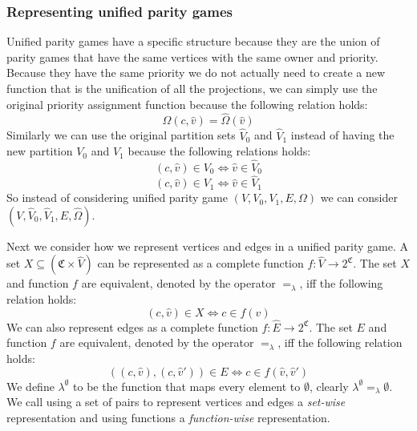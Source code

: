 \subsubsection{Representing unified parity games}
Unified parity games have a specific structure because they are the union of parity games that have the same vertices with the same owner and priority. Because they have the same priority we do not actually need to create a new function that is the unification of all the projections, we can simply use the original priority assignment function because the following relation holds:
\[ \Omega(c,\hat{v}) = \hat{\Omega}(\hat{v}) \]
Similarly we can use the original partition sets $\hat{V}_0$ and $\hat{V}_1$ instead of having the new partition $V_0$ and $V_1$ because the following relations holds:
\[ (c,\hat{v}) \in V_0 \iff \hat{v}\in \hat{V}_0 \]
\[ (c,\hat{v}) \in V_1 \iff \hat{v}\in \hat{V}_1 \]
So instead of considering unified parity game $(V,V_0,V_1,E,\Omega)$ we can consider $(V,\hat{V}_0,\hat{V}_1,E,\hat{\Omega})$. 

Next we consider how we represent vertices and edges in a unified parity game. A set $X \subseteq (\mathfrak{C} \times \hat{V})$ can be represented as a complete function $f : \hat{V} \rightarrow 2^\mathfrak{C}$. The set $X$ and function $f$ are equivalent, denoted by the operator $=_\lambda$, iff the following relation holds:
\[ (c,\hat{v}) \in X \iff c \in f(\hat{v}) \]
We can also represent edges as a complete function $f : \hat{E} \rightarrow 2^\mathfrak{C}$. The set $E$ and function $f$ are equivalent, denoted by the operator $=_\lambda$, iff the following relation holds:
\[ ((c,\hat{v}),(c,\hat{v}')) \in E \iff c \in f(\hat{v},\hat{v}') \]
We define $\lambda^\emptyset$ to be the function that maps every element to $\emptyset$, clearly $\lambda^\emptyset =_\lambda \emptyset$. We call using a set of pairs to represent vertices and edges a \textit{set-wise} representation and using functions a \textit{function-wise} representation.

